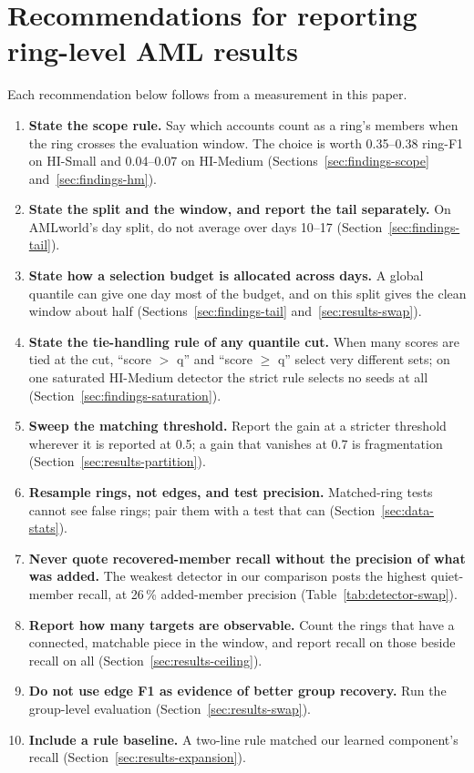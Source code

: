 \section{Recommendations for reporting ring-level AML results}
\label{sec:recommendations}

Each recommendation below follows from a measurement in this paper.

\begin{enumerate}
\item \textbf{State the scope rule.} Say which accounts count as a ring's members when the
  ring crosses the evaluation window. The choice is worth 0.35--0.38 ring-F1 on HI-Small and
  0.04--0.07 on HI-Medium (Sections~\ref{sec:findings-scope} and~\ref{sec:findings-hm}).
\item \textbf{State the split and the window, and report the tail separately.} On AMLworld's
  day split, do not average over days 10--17 (Section~\ref{sec:findings-tail}).
\item \textbf{State how a selection budget is allocated across days.} A global quantile can
  give one day most of the budget, and on this split gives the clean window about half
  (Sections~\ref{sec:findings-tail} and~\ref{sec:results-swap}).
\item \textbf{State the tie-handling rule of any quantile cut.} When many scores are tied at
  the cut, ``score $>$ q'' and ``score $\ge$ q'' select very different sets; on one saturated
  HI-Medium detector the strict rule selects no seeds at all
  (Section~\ref{sec:findings-saturation}).
\item \textbf{Sweep the matching threshold.} Report the gain at a stricter threshold wherever
  it is reported at 0.5; a gain that vanishes at 0.7 is fragmentation
  (Section~\ref{sec:results-partition}).
\item \textbf{Resample rings, not edges, and test precision.} Matched-ring tests cannot see
  false rings; pair them with a test that can (Section~\ref{sec:data-stats}).
\item \textbf{Never quote recovered-member recall without the precision of what was added.}
  The weakest detector in our comparison posts the highest quiet-member recall, at 26\,\%
  added-member precision (Table~\ref{tab:detector-swap}).
\item \textbf{Report how many targets are observable.} Count the rings that have a connected,
  matchable piece in the window, and report recall on those beside recall on all
  (Section~\ref{sec:results-ceiling}).
\item \textbf{Do not use edge F1 as evidence of better group recovery.} Run the group-level
  evaluation (Section~\ref{sec:results-swap}).
\item \textbf{Include a rule baseline.} A two-line rule matched our learned component's recall
  (Section~\ref{sec:results-expansion}).
\end{enumerate}
